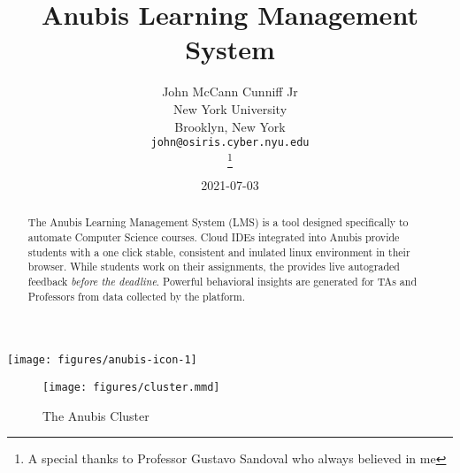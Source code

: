 \documentclass[12pt]{report}
\title{Anubis Learning Management System}
\date{2021-07-03}
\author{%
    John McCann Cunniff Jr \\
    New York University\\
    Brooklyn, New York \\
    \texttt{john@osiris.cyber.nyu.edu} \\
    \thanks{A special thanks to Professor Gustavo Sandoval who always believed in me} \\
}
\begin{document}
    \begin{titlepage}

        \maketitle

        \vspace{0.3cm}
        \begin{center}
            \texttt{[image: figures/anubis-icon-1]}
        \end{center}
        \vspace{0.3cm}

        \begin{abstract}
            The Anubis Learning Management System (LMS) is a tool designed specifically to automate Computer Science courses. 
            Cloud IDEs integrated into Anubis provide students with a one click stable, consistent and inulated linux environment
            in their browser.
            While students work on their assignments, the provides live autograded feedback \textit{before the deadline}.
            Powerful behavioral insights are generated for TAs and Professors from data collected by the platform.
        \end{abstract}


    \end{titlepage}

    \begin{figure}[h]
        \centering
        \texttt{[image: figures/cluster.mmd]}
        \caption{The Anubis Cluster\label{fig:cluster}}
    \end{figure}

    \tableofcontents

    

    

    

    

    

    
\end{document}
